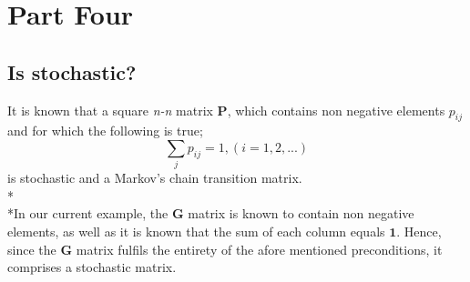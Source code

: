 \documentclass{article}
\begin{document}
\section{Part Four}
\subsection{Is stochastic?}
It is known that a square \emph{n-n} matrix $\mathbf{P}$, which contains non negative elements $p_{ij}$ and for which the following is true;
\[\sum_{j} p_{ij} = 1, (i=1,2,...)\]
is stochastic and a Markov's chain transition matrix.
\\*\\*In our current example, the $\mathbf{G}$ matrix is known to contain non negative elements, as well as it is known that the sum of each column equals $\mathbf{1}$. Hence, since the $\mathbf{G}$ matrix fulfils the entirety of the afore mentioned preconditions, it comprises a stochastic matrix.
\end{document}

